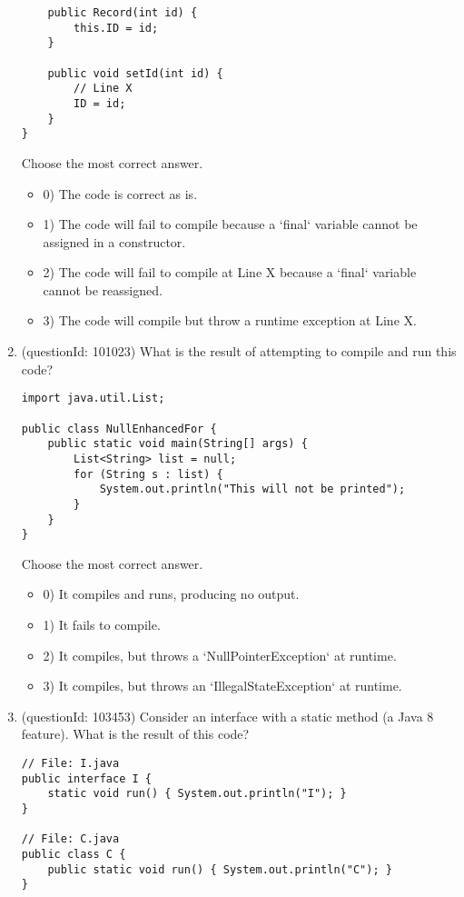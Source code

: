 \documentclass[12pt]{article}
\begin{document}
\begin{enumerate}[label=(\arabic*)]
\begin{verbatim}
    public Record(int id) {
        this.ID = id;
    }

    public void setId(int id) {
        // Line X
        ID = id;
    }
}
\end{verbatim}
Choose the most correct answer. 
\begin{itemize}
\item 0) The code is correct as is.

\item 1) The code will fail to compile because a `final` variable cannot be assigned in a constructor.

\item 2) The code will fail to compile at Line X because a `final` variable cannot be reassigned.

\item 3) The code will compile but throw a runtime exception at Line X.

\end{itemize}
\item (questionId: 101023) What is the result of attempting to compile and run this code?\n\begin{verbatim}
import java.util.List;

public class NullEnhancedFor {
    public static void main(String[] args) {
        List<String> list = null;
        for (String s : list) {
            System.out.println("This will not be printed");
        }
    }
}
\end{verbatim}
Choose the most correct answer. 
\begin{itemize}
\item 0) It compiles and runs, producing no output.

\item 1) It fails to compile.

\item 2) It compiles, but throws a `NullPointerException` at runtime.

\item 3) It compiles, but throws an `IllegalStateException` at runtime.

\end{itemize}
\item (questionId: 103453) Consider an interface with a static method (a Java 8 feature). What is the result of this code?
\begin{verbatim}
// File: I.java
public interface I {
    static void run() { System.out.println("I"); }
}

// File: C.java
public class C {
    public static void run() { System.out.println("C"); }
}


\end{verbatim}
\end{enumerate}
\end{document}
